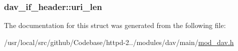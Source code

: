 \subsubsection[{\texorpdfstring{uri\+\_\+len}{uri_len}}]{ dav\+\_\+if\+\_\+header\+::uri\+\_\+len}\hypertarget{structdav__if__header_a2001281285ca779d35e1c880dc7ead20}{}\label{structdav__if__header_a2001281285ca779d35e1c880dc7ead20}


The documentation for this struct was generated from the following file\+:\begin{DoxyCompactItemize}
\item 
/usr/local/src/github/\+Codebase/httpd-\/2../modules/dav/main/\hyperlink{mod__dav_8h}{mod\+\_\+dav.\+h}\end{DoxyCompactItemize}
